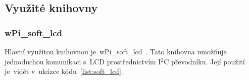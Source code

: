\subsection{Využité knihovny}
\subsubsection{wPi\_soft\_lcd}
Hlavní využitou knihovnou je~wPi\_soft\_lcd~\cite{wpi-lcd}. Tato knihovna umožňuje jednoduchou komunikaci s~LCD prostřednictvím I$^{2}$C převodníku. Její použití je~vidět v~ukázce kódu~\ref{list:soft_lcd}.

\begin{code}
    \inputminted[frame=lines,fontsize=\footnotesize{}, linenos, breaklines]{cpp}{code_examples/soft_lcd.cpp}
\end{code}

